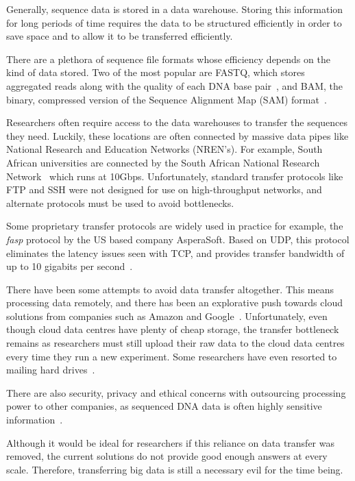 \documentclass{sig-alternate-05-2015}
\begin{document}
Generally, sequence data is stored in a data warehouse. Storing this information for long periods of time requires the data to be structured efficiently in order to save space and to allow it to be transferred efficiently.

There are a plethora of sequence file formats whose efficiency depends on the kind of data stored. Two of the most popular are FASTQ, which stores aggregated reads along with the quality of each DNA base pair~\cite{cock2010sanger}, and BAM, the binary, compressed version of the Sequence Alignment Map (SAM) format~\cite{SAMspec}.

Researchers often require access to the data warehouses to transfer the sequences they need. Luckily, these locations are often connected by massive data pipes like National Research and Education Networks (NREN's). For example, South African universities are connected by the South African National Research Network~\cite{sanren} which runs at 10Gbps. Unfortunately, standard transfer protocols like FTP and SSH were not designed for use on high-throughput networks, and alternate protocols must be used to avoid bottlenecks.

Some proprietary transfer protocols are widely used in practice \emdash for example, the \textit{fasp} protocol by the US based company AsperaSoft. Based on UDP, this protocol eliminates the latency issues seen with TCP, and provides transfer bandwidth of up to 10 gigabits per second~\cite{fan2010petabytes}.

There have been some attempts to avoid data transfer altogether. This means processing data remotely, and there has been an explorative push towards cloud solutions from companies such as Amazon and Google~\cite{baker2010next}. Unfortunately, even though cloud data centres have plenty of cheap storage, the transfer bottleneck remains as researchers must still upload their raw data to the cloud data centres every time they run a new experiment. Some researchers have even resorted to mailing hard drives~\cite{baker2010next}.

There are also security, privacy and ethical concerns with outsourcing processing power to other companies, as sequenced DNA data is often highly sensitive information~\cite{marx2013biology}.

Although it would be ideal for researchers if this reliance on data transfer was removed, the current solutions do not provide good enough answers at every scale. Therefore, transferring big data is still a necessary evil for the time being.
\end{document}
